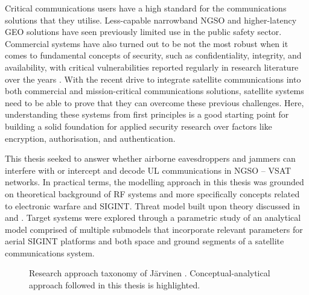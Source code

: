 \documentclass[english, 12pt, a4paper, elec, utf8, a-1b, online]{aaltothesis}
\begin{document}
Critical communications users have a high standard for the communications solutions that they utilise.
Less-capable narrowband NGSO and higher-latency GEO solutions have seen previously limited use in the public safety sector. Commercial systems have also turned out to be not the most robust when it comes to fundamental concepts of security, such as confidentiality, integrity, and availability, with critical vulnerabilities reported regularly in research literature over the years \cite{lin2022defending,pavur2020tale,santamarta2014wake,schia2023subsea}.
With the recent drive to integrate satellite communications into both commercial and mission-critical communications solutions, satellite systems need to be able to prove that they can overcome these previous challenges.
Here, understanding these systems from first principles is a good starting point for building a solid foundation for applied security research over factors like encryption, authorisation, and authentication.

This thesis seeked to answer whether airborne eavesdroppers and jammers can interfere with or intercept and decode UL communications in NGSO -- VSAT networks.
In practical terms, the modelling approach in this thesis was grounded on theoretical background of RF systems and more specifically concepts related to electronic warfare and SIGINT.
Threat model built upon theory discussed in \cite{kosola2013digitaalinen} and \cite{wiley2006elint}.
Target systems were explored through a parametric study of an analytical model comprised of multiple submodels that incorporate relevant parameters for aerial SIGINT platforms and both space and ground segments of a satellite communications system.

\begin{figure}[h]
  \centering
  
  \caption{Research approach taxonomy of Järvinen \cite{jarvinen2011tutkimustyon, jarvinen2004research}. Conceptual-analytical approach followed in this thesis is highlighted.}
  \label{fig-research-taxonomy}
\end{figure}
\end{document}
